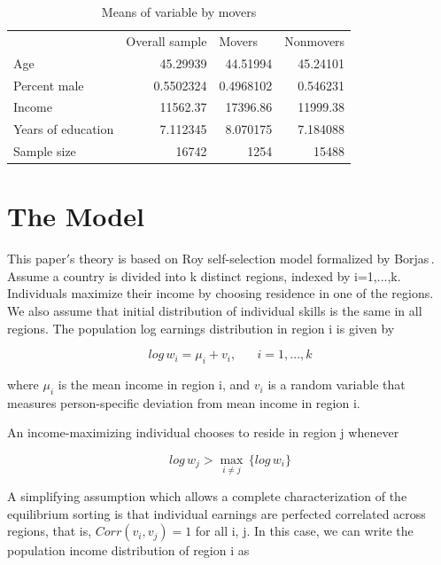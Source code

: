 \documentclass{article}
\begin{document}
\begin{table}[htbp]
  \centering
  \caption{Means of variable by movers}
    \begin{tabular}{lrrr}
    &       &       &  \\
    \toprule
    & \multicolumn{1}{l}{Overall sample} & \multicolumn{1}{l}{Movers} & \multicolumn{1}{l}{Nonmovers} \\
    \midrule
    Age   & 45.29939 & 44.51994 & 45.24101 \\
    Percent male & 0.5502324 & 0.4968102 & 0.546231 \\
    Income & 11562.37 & 17396.86 & 11999.38 \\
    Years of education & 7.112345 & 8.070175 & 7.184088 \\
    Sample size & 16742 & 1254  & 15488 \\
    \bottomrule
    \end{tabular}%
  \label{table2}%
\end{table}%

\section{The Model}\label{third_section}

This paper$'$s theory is based on Roy self-selection model formalized by Borjas\,\cite{borjas_self-selection_1987}. Assume a country is divided into k distinct regions, indexed by i=1,...,k. Individuals maximize their income by choosing residence in one of the regions. We also assume that initial distribution of individual skills is the same in all regions. The population log earnings distribution in region i is given by

\begin{equation}\label{1_math}
log\,w_{i} = \mu_{i} + v_{i}, \hspace{20pt} i = 1,...,k
\end{equation}

where $\mu_{i}$ is the mean income in region i, and $v_{i}$ is a random variable that measures person-specific deviation from mean income in region i.

An income-maximizing individual chooses to reside in region j whenever

\begin{equation}\label{2_math}
log\,w_{j} > \max_{i\neq j}\,\{log\, w_{i} \}
\end{equation}

A simplifying assumption which allows a complete characterization of the equilibrium sorting is that individual earnings are perfected correlated across regions, that is, $Corr(v_{i},v_{j})=1$ for all i, j. In this case, we can write the population income distribution of region i as
\end{document}
